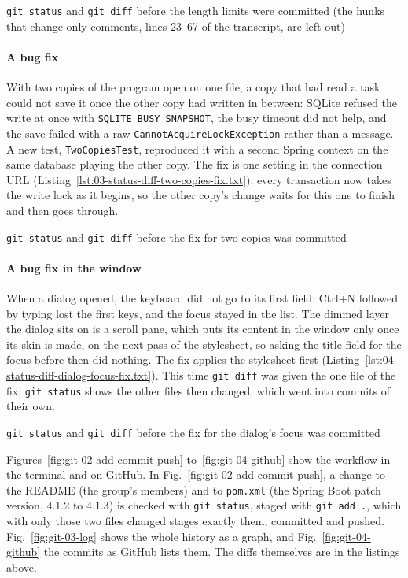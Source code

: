  {\texttt{git status} and \texttt{git diff} before the length limits were committed (the hunks that change only
   comments, lines 23--67 of the transcript, are left out)}

\paragraph*{A bug fix} With two copies of the program open on one file, a copy that had read a task could not save it
once the other copy had written in between: SQLite refused the write at once with \texttt{SQLITE\_BUSY\_SNAPSHOT},
the busy timeout did not help, and the save failed with a raw \texttt{CannotAcquireLockException} rather than a
message.
A new test, \texttt{TwoCopiesTest}, reproduced it with a second Spring context on the same database playing the other
copy. The fix is one setting in the connection URL (Listing~\ref{lst:03-status-diff-two-copies-fix.txt}): every
transaction now takes the write lock as it begins, so the other copy's change waits for this one to finish and then
goes through.

  {\texttt{git status} and \texttt{git diff} before the fix for two copies was committed}

\paragraph*{A bug fix in the window} When a dialog opened, the keyboard did not go to its first field: Ctrl+N
followed by typing lost the first keys, and the focus stayed in the list. The dimmed layer the dialog sits on is a
scroll pane, which puts its content in the window only once its skin is made, on the next pass of the stylesheet, so
asking the title field for the focus before then did nothing. The fix applies the stylesheet first
(Listing~\ref{lst:04-status-diff-dialog-focus-fix.txt}). This time \texttt{git diff} was given the one file of the
fix; \texttt{git status} shows the other files then changed, which went into commits of their own.

  {\texttt{git status} and \texttt{git diff} before the fix for the dialog's focus was committed}

Figures~\ref{fig:git-02-add-commit-push} to~\ref{fig:git-04-github} show the workflow in the terminal and on GitHub.
In Fig.~\ref{fig:git-02-add-commit-push}, a change to the README (the group's members) and to \texttt{pom.xml} (the
Spring Boot patch version, 4.1.2 to 4.1.3) is checked with \texttt{git status}, staged with \texttt{git add .}, which
with only those two files changed stages exactly them, committed and pushed. Fig.~\ref{fig:git-03-log} shows the
whole history as a graph, and Fig.~\ref{fig:git-04-github} the commits as GitHub lists them. The diffs themselves are
in the listings above.

